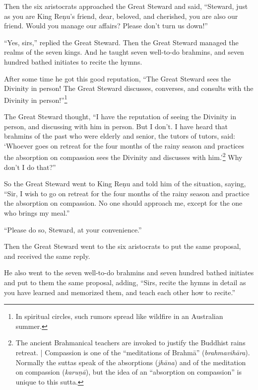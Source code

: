\documentclass[12pt,openany]{book}%
\begin{document}
Then the six aristocrats approached the Great Steward and said, “Steward, just as you are King \textsanskrit{Reṇu}’s friend, dear, beloved, and cherished, you are also our friend. Would you manage our affairs? Please don’t turn us down!” 

“Yes, sirs,” replied the Great Steward. Then the Great Steward managed the realms of the seven kings. And he taught seven well-to-do brahmins, and seven hundred bathed initiates to recite the hymns. 

After some time he got this good reputation, “The Great Steward sees the Divinity in person! The Great Steward discusses, converses, and consults with the Divinity in person!”\footnote{In spiritual circles, such rumors spread like wildfire in an Australian summer. } 

The Great Steward thought, “I have the reputation of seeing the Divinity in person, and discussing with him in person. But I don’t. I have heard that brahmins of the past who were elderly and senior, the tutors of tutors, said: ‘Whoever goes on retreat for the four months of the rainy season and practices the absorption on compassion sees the Divinity and discusses with him.’\footnote{The ancient Brahmanical teachers are invoked to justify the Buddhist rains retreat. | Compassion is one of the “meditations of \textsanskrit{Brahmā}” (\textit{\textsanskrit{brahmavihāra}}). Normally the suttas speak of the absorptions (\textit{\textsanskrit{jhāna}}) and of the meditation on compassion (\textit{\textsanskrit{karuṇā}}), but the idea of an “absorption on compassion” is unique to this sutta. } Why don’t I do that?” 

So the Great Steward went to King \textsanskrit{Reṇu} and told him of the situation, saying, “Sir, I wish to go on retreat for the four months of the rainy season and practice the absorption on compassion. No one should approach me, except for the one who brings my meal.” 

“Please do so, Steward, at your convenience.” 

Then the Great Steward went to the six aristocrats to put the same proposal, and received the same reply. 

He also went to the seven well-to-do brahmins and seven hundred bathed initiates and put to them the same proposal, adding, “Sirs, recite the hymns in detail as you have learned and memorized them, and teach each other how to recite.” 
\end{document}
